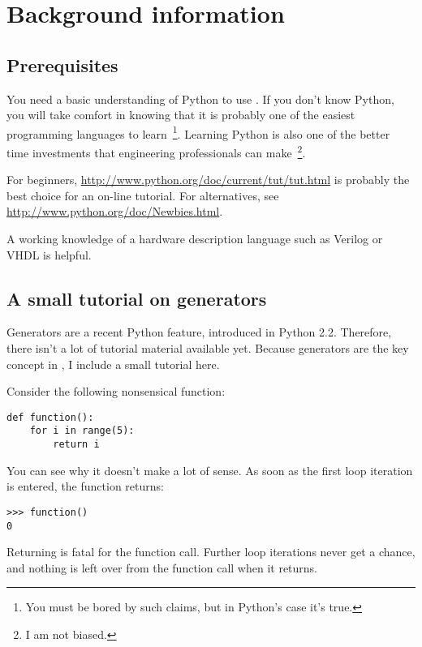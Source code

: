 \chapter{Background information \label{background}}

\section{Prerequisites \label{prerequisites}}

You need a basic understanding of Python to use \myhdl{}.
If you don't know Python, you will take comfort in knowing
that it is probably one of the easiest programming languages to
learn~\footnote{You must be bored by such claims, but in Python's
case it's true.}. Learning Python is also one of the better time
investments that engineering professionals can make~\footnote{I am not
biased.}.

For beginners, \url{http://www.python.org/doc/current/tut/tut.html} is
probably the best choice for an on-line tutorial. For alternatives,
see \url{http://www.python.org/doc/Newbies.html}.

A working knowledge of a hardware description language such as Verilog
or VHDL is helpful. 

\section{A small tutorial on generators \label{tutorial}}

Generators are a recent Python feature, introduced in
Python 2.2. Therefore, there isn't a lot of tutorial material
available yet. Because generators are the key concept in
\myhdl{}, I include a small tutorial here.

Consider the following nonsensical function:

\begin{verbatim}
def function():
    for i in range(5):
        return i
\end{verbatim}

You can see why it doesn't make a lot of sense. As soon as the first
loop iteration is entered, the function returns:

\begin{verbatim}
>>> function()
0
\end{verbatim}

Returning is fatal for the function call. Further loop iterations
never get a chance, and nothing is left over from the function call
when it returns.

